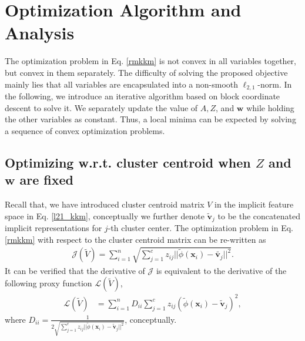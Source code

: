 \documentclass{article}
\begin{document}
\section{Optimization Algorithm and Analysis}
The optimization problem in Eq. \eqref{rmkkm} is not convex in all variables together, but convex in them separately. The difficulty of solving the proposed objective mainly lies that all variables are encapsulated into a non-smooth $\ell_{2,1}$-norm. In the following, we introduce an iterative algorithm based on block coordinate descent to solve it. We separately update the value of $A,Z$, and $\bm{w}$ while holding the other variables as constant. Thus, a local minima can be expected by solving a sequence of convex optimization problems.

\subsection{Optimizing w.r.t. cluster centroid when $Z$ and $\bm{w}$ are fixed}
Recall that, we have introduced cluster centroid matrix $V$ in the implicit feature space in Eq. \eqref{l21_kkm}, conceptually we further denote $\tilde{\bm{v}}_j$ to be the concatenated implicit representations for $j$-th cluster center. The optimization problem in Eq. \eqref{rmkkm} with respect to the cluster centroid matrix can be re-written as
\begin{align}
	\mathcal{J}(\tilde{V}) = \sum_{i=1}^{n} \sqrt{ \sum_{j=1}^{c} z_{ij} ||\tilde{\phi}(\bm{x}_i) - \tilde{\bm{v}_j}||^2}.
\end{align}
It can be verified that the derivative of $\mathcal{J}$ is equivalent to the derivative of the following proxy function $\mathcal{L}(\tilde{V})$,
\begin{align}\label{w_kkm}
  \mathcal{L}(\tilde{V}) &= \sum_{i=1}^{n} D_{ii} \sum_{j=1}^{c} z_{ij}(\tilde{\phi}(\bm{x}_i) - \tilde{\bm{v}}_j)^2,
\end{align}
where $D_{ii}=\frac{1}{2\sqrt{ \sum_{j=1}^{c} z_{ij} ||\tilde{\phi}(\bm{x}_i) - \tilde{\bm{v}}_j||^2}}$, conceptually.
\end{document}
